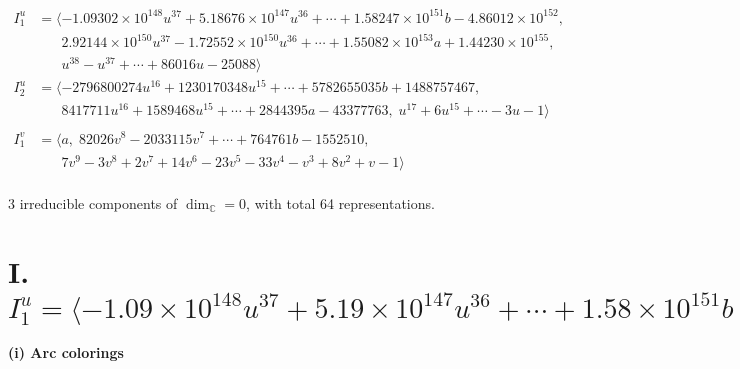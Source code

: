 \documentclass[1p]{elsarticle_modified}
\theoremstyle{definition}
\begin{document}
\begin{align*}
I^u_{1}&=\langle 
-1.09302\times10^{148} u^{37}+5.18676\times10^{147} u^{36}+\cdots+1.58247\times10^{151} b-4.86012\times10^{152},\\
\phantom{I^u_{1}}&\phantom{= \langle  }2.92144\times10^{150} u^{37}-1.72552\times10^{150} u^{36}+\cdots+1.55082\times10^{153} a+1.44230\times10^{155},\\
\phantom{I^u_{1}}&\phantom{= \langle  }u^{38}- u^{37}+\cdots+86016 u-25088\rangle \\
I^u_{2}&=\langle 
-2796800274 u^{16}+1230170348 u^{15}+\cdots+5782655035 b+1488757467,\\
\phantom{I^u_{2}}&\phantom{= \langle  }8417711 u^{16}+1589468 u^{15}+\cdots+2844395 a-43377763,\;u^{17}+6 u^{15}+\cdots-3 u-1\rangle \\
\\
I^v_{1}&=\langle 
a,\;82026 v^8-2033115 v^7+\cdots+764761 b-1552510,\\
\phantom{I^v_{1}}&\phantom{= \langle  }7 v^9-3 v^8+2 v^7+14 v^6-23 v^5-33 v^4- v^3+8 v^2+v-1\rangle \\
\end{align*}
\raggedright * 3 irreducible components of $\dim_{\mathbb{C}}=0$, with total 64 representations.\\
\newpage
\renewcommand{\arraystretch}{1}
\centering \section*{I. $I^u_{1}= \langle -1.09\times10^{148} u^{37}+5.19\times10^{147} u^{36}+\cdots+1.58\times10^{151} b-4.86\times10^{152},\;2.92\times10^{150} u^{37}-1.73\times10^{150} u^{36}+\cdots+1.55\times10^{153} a+1.44\times10^{155},\;u^{38}- u^{37}+\cdots+86016 u-25088 \rangle$}
\flushleft \textbf{(i) Arc colorings}\\
\end{document}
